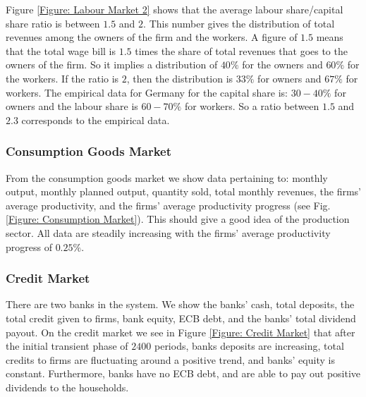 Figure \ref{Figure: Labour Market 2} shows that the average labour share/capital share ratio is between $1.5$ and $2$. This number gives the distribution of total revenues among the owners of the firm and the workers. A figure of $1.5$ means that the total wage bill is $1.5$ times the share of total revenues that goes to the owners of the firm. So it implies a distribution of $40\%$ for the owners and $60\%$ for the workers. If the ratio is $2$, then the distribution is $33\%$ for owners and $67\%$ for workers. The empirical data for Germany for the capital share is: $30-40\%$ for owners and the labour share is $60-70\%$ for workers. So a ratio between $1.5$ and $2.3$ corresponds to the empirical data.

\subsubsection*{Consumption Goods Market}
From the consumption goods market we show data pertaining to: monthly output, monthly planned output, quantity sold, total monthly revenues,
the firms' average productivity, and the firms' average productivity progress (see Fig. \ref{Figure: Consumption Market}). This should give a good idea of the production sector. All data are steadily increasing with the firms' average productivity progress of $0.25\%$.

\subsubsection*{Credit Market}
There are two banks in the system. 
We show the banks' cash, total deposits, the total credit given to firms, bank equity, ECB debt, and the banks' total dividend payout.
On the credit market we see in Figure \ref{Figure: Credit Market} that after the initial transient phase of $2400$ periods, banks deposits are increasing, total credits to firms are fluctuating around a positive trend, and banks' equity is constant. Furthermore, banks have no ECB debt, and are able to pay out positive dividends to the households.

\begin{comment}
\section{Tax rate scenarios}
As a first sensitivity analysis we consider a variation in the income tax rate from $1-8\%$ and $10,15,20\%$, see Figure \ref{Figure: scenarios}.
We show results for $20$ batch runs, $4000$ periods each, for each value of the tax rate parameter.
It appears that the GDP growth rate, the unemployment rate and the investment/GDP ratio are not very sensitive to increases in the tax rate.
\end{comment}



%

